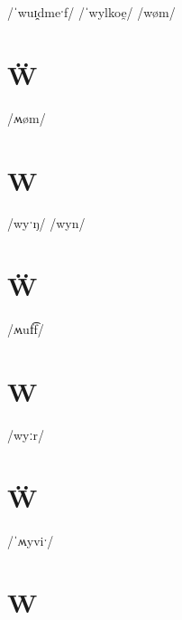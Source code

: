 \documentclass[10pt,a4paper,twoside]{book}
\begin{document}
\begin{multicols}{3}
 {/ˈwuɪ̯dmeˑf/} {}
 {/ˈwylkoe̯/} {}
 {/wøm/} {}
\end{multicols}

\section*{Ẅ}

\begin{multicols}{3}
 {/ʍøm/} {}
\end{multicols}

\section*{W}

\begin{multicols}{3}
 {/wyˑŋ/} {}
 {/wyn/} {}
\end{multicols}

\section*{Ẅ}

\begin{multicols}{3}
 {/ʍuf͡f/} {}
\end{multicols}

\section*{W}

\begin{multicols}{3}
 {/wyːr/} {}
\end{multicols}

\section*{Ẅ}

\begin{multicols}{3}
 {/ˈʍyviˑ/} {}
\end{multicols}

\section*{W}
\end{document}
